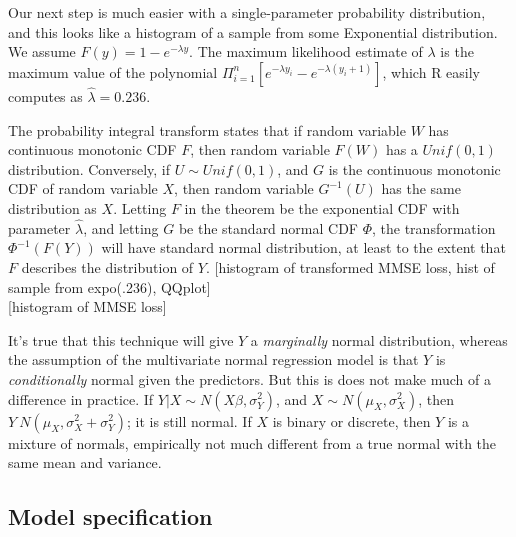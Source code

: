 \documentclass[12pt]{article}
\begin{document}
Our next step is much easier with a single-parameter probability distribution, and this looks like a histogram of a sample from some Exponential distribution. We assume $F(y) = 1 - e^{-\lambda y}$. The maximum likelihood estimate of $\lambda$ is the maximum value of the polynomial $\Pi_{i=1}^{n}\left[ e^{-\lambda y_i} - e^{-\lambda (y_i + 1)} \right]$, which R easily computes as $\hat{\lambda} = 0.236$. 

The probability integral transform states that if random variable $W$ has continuous monotonic CDF $F$, then random variable $F(W)$ has a $Unif(0,1)$ distribution. Conversely, if $U \sim Unif(0,1)$, and $G$ is the continuous monotonic CDF of random variable $X$, then random variable $G^{-1}(U)$ has the same distribution as $X$. Letting $F$ in the theorem be the exponential CDF with parameter $\hat{\lambda}$, and letting $G$ be the standard normal CDF $\Phi$, the transformation $\Phi^{-1}(F(Y))$ will have standard normal distribution, at least to the extent that $F$ describes the distribution of $Y$. 
{\color{teal}[histogram of transformed MMSE loss, hist of sample from expo(.236), QQplot]} \\
{\color{teal}[histogram of MMSE loss]}

It's true that this technique will give $Y$ a \textit{marginally} normal distribution, whereas the assumption of the multivariate normal regression model is that $Y$ is \textit{conditionally} normal given the predictors. But this is does not make much of a difference in practice. If $Y|X \sim N(X\beta, \sigma_{Y}^{2})$, and $X \sim N(\mu_X, \sigma_{X}^{2})$, then $Y ~ N(\mu_X, \sigma_{X}^{2} + \sigma_{Y}^{2})$; it is still normal. If $X$ is binary or discrete, then $Y$ is a mixture of normals, empirically not much different from a true normal with the same mean and variance. 




\subsection{Model specification}
\end{document}
